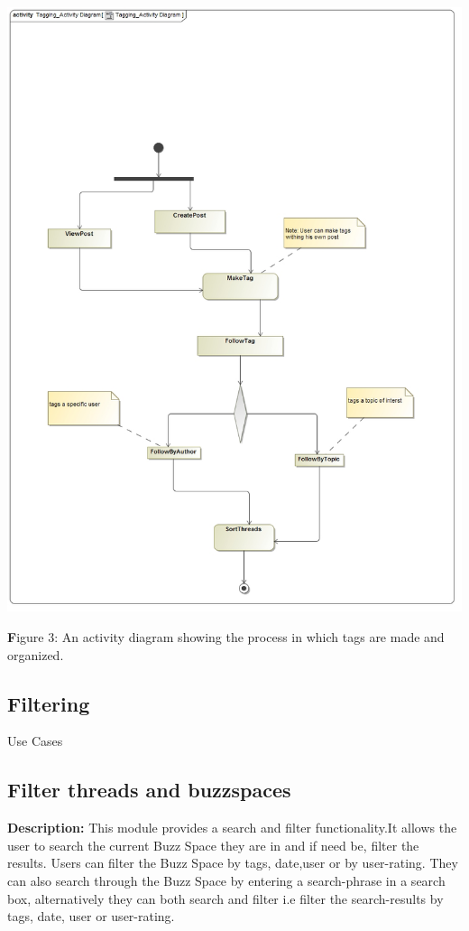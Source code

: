 \documentclass[a4paper,11pt]{article}
\begin{document}
\begin{center}
\includegraphics[width=0.9\linewidth]{Images/SocialTagging/Tagging_Activity_Diagram}
\end{center}

\textbf Figure 3: An activity diagram showing the process in which tags are made and organized. 

\newpage
\begin{center}
\section{\textbf{\huge{Filtering}}}
\Large{Use Cases}
\end{center}
\subsection{Filter threads and buzzspaces}
\textbf{Description:} This module provides a search and filter functionality.It allows the user to search the current Buzz Space they are in and if need be, filter the results. Users can filter the Buzz Space by tags, date,user or by user-rating. They can also search through the Buzz Space by entering a search-phrase in a search box, alternatively they can both search and filter i.e filter the search-results by tags, date, user or user-rating.\\
\end{document}
